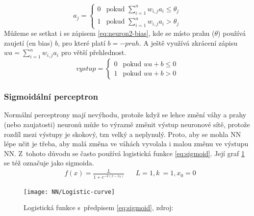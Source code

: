 \documentclass[12pt]{report}			%
\begin{document}
	\begin{equation}
	\label{eq:neuron2}
	a_j = 
		\begin{cases}
		0 & \text{pokud $\sum_{i=1}^{n} w_{i,j} a_i \leq \theta_{j}$}\\
		1 & \text{pokud $\sum_{i=1}^{n} w_{i,j} a_i > \theta_{j}$}
		\end{cases}
	\end{equation}
	Můžeme se setkat i se zápisem \eqref{eq:neuron2-bias}, kde se místo prahu ($\theta$) používá zaujetí (\gls{en} bias) $b$, pro které platí $b = - prah$. A ještě využívá zkrácení zápisu $ w a = \sum_{i=1}^{n} w_{i,j} a_i $ pro větší přehlednost.\parencite[\gls{k} 1.1]{NN-Nielsen-web}
	\begin{equation}
	\label{eq:neuron2-bias}
	vystup = 
		\begin{cases}
		0 & \text{pokud $w a  + b \leq 0$}\\
		1 & \text{pokud $w a  + b > 0$}
		\end{cases}
	\end{equation}
	
	\subsubsection{Sigmoidální perceptron}
	Normální perceptrony mají nevýhodu, protože když se lehce změní váhy a prahy (nebo zaujatosti) neuronů může to výrazně změnit výstup neuronové sítě, protože rozdíl mezi výstupy je skokový, \gls{tzn} velký a neplynulý. Proto, aby se mohla \gls{NN} lépe učit je třeba, aby malá změna ve váhách vyvolala i malou změnu ve výstupu \gls{NN}. Z~tohoto důvodu se často používá logistická funkce \eqref{eq:sigmoid}. Její graf \ref{fig:sigmoid} se též označuje jako sigmoida. \parencite[\gls{k} 1.2]{NN-Nielsen-web}
	\begin{align}
	\label{eq:sigmoid}
	&f(x) = \frac{L}{1 + e^{-k (x - x_0)}} && L = 1, k~= 1, x_0 = 0
	\end{align}
	\begin{figure}
	\texttt{[image: NN/Logistic-curve]}
	\centering
	\caption{Logistická funkce s~předpisem \eqref{eq:sigmoid}, zdroj: \parencite{wiki_logistic_function}}
	\label{fig:sigmoid}
	\end{figure}
	
\end{document}
